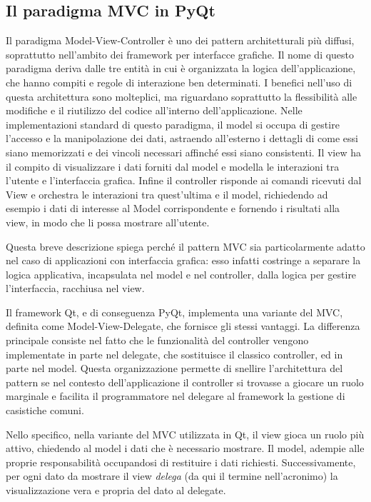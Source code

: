 \documentclass[12pt]{toptesi}
\begin{document}
\subsection{Il paradigma MVC in PyQt}

Il paradigma Model-View-Controller è uno dei pattern architetturali più diffusi, soprattutto nell'ambito dei framework per interfacce grafiche. Il nome di questo paradigma deriva dalle tre entità in cui è organizzata la logica dell'applicazione, che hanno  compiti e regole di interazione ben determinati. I benefici nell'uso di questa architettura sono molteplici, ma riguardano soprattutto la flessibilità alle modifiche e il riutilizzo del codice all'interno dell'applicazione. 
Nelle implementazioni standard di questo paradigma, il model si occupa di gestire l'accesso e la manipolazione dei dati, astraendo all'esterno i dettagli di come essi siano memorizzati e dei vincoli necessari affinché essi siano consistenti.
Il view ha il compito di visualizzare i dati forniti dal model e modella le interazioni tra l'utente e l'interfaccia grafica. Infine il controller risponde  ai comandi ricevuti dal View e orchestra le interazioni tra quest'ultima e il model, richiedendo ad esempio i dati di interesse al Model corrispondente e fornendo i risultati alla view, in modo che li possa mostrare all'utente.

Questa breve descrizione spiega perché il pattern MVC sia particolarmente adatto nel caso di applicazioni con interfaccia grafica: esso infatti costringe a separare la logica applicativa, incapsulata nel model e nel controller, dalla logica per gestire l'interfaccia, racchiusa nel view. 

Il framework Qt, e di conseguenza PyQt, implementa una variante del MVC, definita come Model-View-Delegate, che fornisce gli stessi vantaggi. La differenza principale consiste nel fatto che le funzionalità del controller vengono implementate in parte nel delegate, che sostituisce il classico controller, ed in parte nel model. Questa organizzazione permette di snellire l'architettura del pattern se nel contesto dell'applicazione il controller si trovasse a giocare un ruolo marginale e facilita il programmatore nel delegare al framework la gestione di casistiche comuni.

Nello specifico, nella variante del MVC utilizzata in Qt, il view gioca un ruolo più attivo, chiedendo al model i dati che è necessario mostrare. Il model, adempie alle proprie responsabilità occupandosi di restituire i dati richiesti. Successivamente, per ogni dato da mostrare il view \emph{delega} (da qui il termine nell'acronimo) la visualizzazione vera e propria del dato al delegate. 
\end{document}
